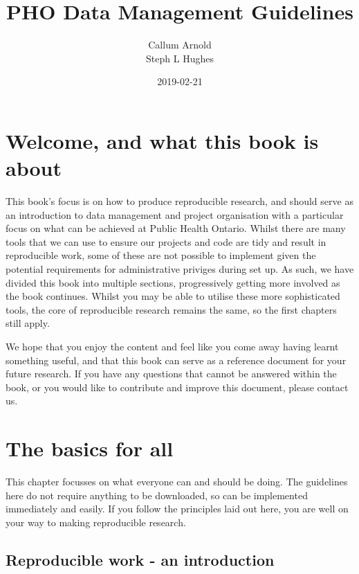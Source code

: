 \documentclass[]{book}
\title{PHO Data Management Guidelines}
\author{Callum Arnold \\ Steph L Hughes}
\date{2019-02-21}
\begin{document}
\maketitle

{
\setcounter{tocdepth}{1}
\tableofcontents
}
\hypertarget{welcome-and-what-this-book-is-about}{%
\chapter*{Welcome, and what this book is about}\label{welcome-and-what-this-book-is-about}}

This book's focus is on how to produce reproducible research, and should serve as an introduction to data management and project organisation with a particular focus on what can be achieved at Public Health Ontario. Whilst there are many tools that we can use to ensure our projects and code are tidy and result in reproducible work, some of these are not possible to implement given the potential requirements for administrative priviges during set up. As such, we have divided this book into multiple sections, progressively getting more involved as the book continues. Whilst you may be able to utilise these more sophisticated tools, the core of reproducible research remains the same, so the first chapters still apply.

We hope that you enjoy the content and feel like you come away having learnt something useful, and that this book can serve as a reference document for your future research. If you have any questions that cannot be answered within the book, or you would like to contribute and improve this document, please contact us.

\hypertarget{the-basics-for-all}{%
\chapter{The basics for all}\label{the-basics-for-all}}

This chapter focusses on what everyone can and should be doing. The guidelines here do not require anything to be downloaded, so can be implemented immediately and easily. If you follow the principles laid out here, you are well on your way to making reproducible research.

\hypertarget{reproducible-work---an-introduction}{%
\section{Reproducible work - an introduction}\label{reproducible-work---an-introduction}}
\end{document}
